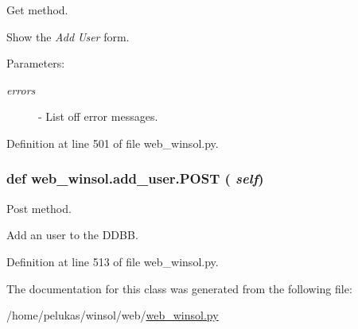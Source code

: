 Get method. 

Show the {\em Add\/} {\em User\/} form.

\begin{Desc}
\item[Parameters:]
\begin{description}
\item[{\em errors}]- List off error messages. \end{description}
\end{Desc}


Definition at line 501 of file web\_\-winsol.py.\hypertarget{classweb__winsol_1_1add__user_10b3cb243b874f49cc024ac8ad86b773}{
\subsubsection[POST]{\setlength{\rightskip}{0pt plus 5cm}def web\_\-winsol.add\_\-user.POST ( {\em self})}}
\label{classweb__winsol_1_1add__user_10b3cb243b874f49cc024ac8ad86b773}


Post method. 

Add an user to the DDBB. 

Definition at line 513 of file web\_\-winsol.py.

The documentation for this class was generated from the following file:\begin{CompactItemize}
\item 
/home/pelukas/winsol/web/\hyperlink{web__winsol_8py}{web\_\-winsol.py}\end{CompactItemize}
